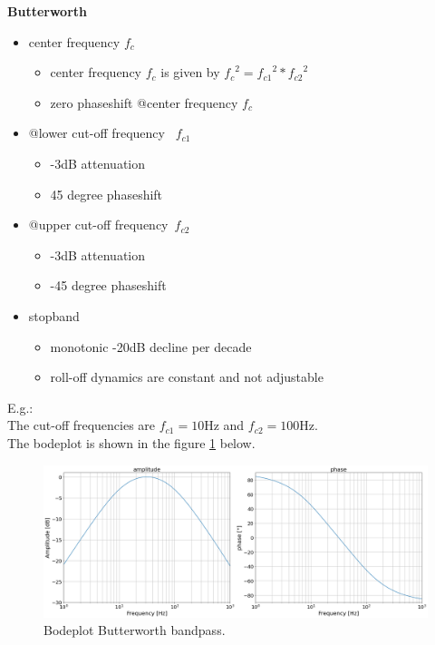 
\textbf{Butterworth}
\begin{itemize}
    \item center frequency $f_c$
    \begin{itemize}
        \item center frequency $f_c$ is given by ${f_c}^2={f_{c1}}^2*{f_{c2}}^2$
		\item zero phaseshift @center frequency $f_c$
    \end{itemize}
    \item @lower cut-off frequency~ $f_{c1}$
    \begin{itemize}
        \item -3dB attenuation
        \item 45 degree phaseshift
    \end{itemize}
	\item @upper cut-off frequency~$f_{c2}$
    \begin{itemize}
        \item -3dB attenuation
        \item -45 degree phaseshift
    \end{itemize}
    \item stopband 
    \begin{itemize}
        \item monotonic -20dB decline per decade
		\item roll-off dynamics are constant and not adjustable
    \end{itemize} 
\end{itemize}

E.g.: \\
The cut-off frequencies are $f_{c1}=10$Hz and $f_{c2}=100$Hz.\\
The bodeplot is shown in the figure \ref{fig:bp_butter} below.
\begin{figure}[h!]
  \centering
  \includegraphics[width=.75\linewidth]{bp_butter.png}
  \caption{Bodeplot Butterworth bandpass.}
  \label{fig:bp_butter}
\end{figure}
	
